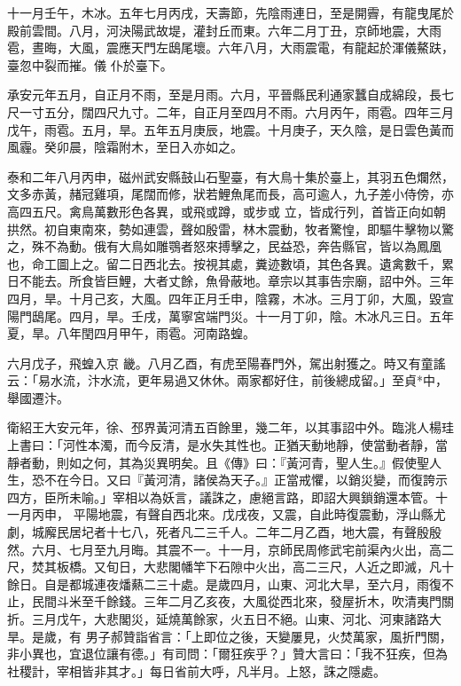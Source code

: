 \begin{pinyinscope}
 十一月壬午，木冰。五年七月丙戌，天壽節，先陰雨連日，至是開霽，有龍曳尾於殿前雲間。八月，河決陽武故堤，灌封丘而東。六年二月丁丑，京師地震，大雨雹，晝晦，大風，震應天門左鴟尾壞。六年八月，大雨震電，有龍起於渾儀鰲趺，臺忽中裂而摧。儀
 仆於臺下。



 承安元年五月，自正月不雨，至是月雨。六月，平晉縣民利通家蠶自成綿段，長七尺一寸五分，闊四尺九寸。二年，自正月至四月不雨。六月丙午，雨雹。四年三月戊午，雨雹。五月，旱。五年五月庚辰，地震。十月庚子，天久陰，是日雲色黃而風霾。癸卯晨，陰霜附木，至日入亦如之。



 泰和二年八月丙申，磁州武安縣鼓山石聖臺，有大鳥十集於臺上，其羽五色爛然，文多赤黃，赭冠雞項，尾闊而修，狀若鯉魚尾而長，高可逾人，九子差小侍傍，亦高四五尺。禽鳥萬數形色各異，或飛或蹲，或步或
 立，皆成行列，首皆正向如朝拱然。初自東南來，勢如連雲，聲如殷雷，林木震動，牧者驚惶，即驅牛擊物以驚之，殊不為動。俄有大鳥如雕鶚者怒來搏擊之，民益恐，奔告縣官，皆以為鳳凰也，命工圖上之。留二日西北去。按視其處，糞迹數頃，其色各異。遺禽數千，累日不能去。所食皆巨鯉，大者丈餘，魚骨蔽地。章宗以其事告宗廟，詔中外。三年四月，旱。十月己亥，大風。四年正月壬申，陰霧，木冰。三月丁卯，大風，毀宣陽門鴟尾。四月，旱。壬戌，萬寧宮端門災。十一月丁卯，陰。木冰凡三日。五年夏，旱。八年閏四月甲午，雨雹。河南路蝗。



 六月戊子，飛蝗入京
 畿。八月乙酉，有虎至陽春門外，駕出射獲之。時又有童謠云：「易水流，汴水流，更年易過又休休。兩家都好住，前後總成留。」至貞*中，舉國遷汴。



 衛紹王大安元年，徐、邳界黃河清五百餘里，幾二年，以其事詔中外。臨洮人楊珪上書曰：「河性本濁，而今反清，是水失其性也。正猶天動地靜，使當動者靜，當靜者動，則如之何，其為災異明矣。且《傳》曰：『黃河青，聖人生。』假使聖人生，恐不在今日。又曰『黃河清，諸侯為天子。』正當戒懼，以銷災變，而復誇示四方，臣所未喻。」宰相以為妖言，議誅之，慮絕言路，即詔大興鎖銷還本管。十一月丙申，
 平陽地震，有聲自西北來。戊戌夜，又震，自此時復震動，浮山縣尤劇，城廨民居圮者十七八，死者凡二三千人。二年二月乙酉，地大震，有聲殷殷然。六月、七月至九月晦。其震不一。十一月，京師民周修武宅前渠內火出，高二尺，焚其板橋。又旬日，大悲閣幡竿下石隙中火出，高二三尺，人近之即滅，凡十餘日。自是都城連夜燔爇二三十處。是歲四月，山東、河北大旱，至六月，雨復不止，民間斗米至千餘錢。三年二月乙亥夜，大風從西北來，發屋折木，吹清夷門關折。三月戊午，大悲閣災，延燒萬餘家，火五日不絕。山東、河北、河東諸路大旱。是歲，有
 男子郝贊詣省言：「上即位之後，天變屢見，火焚萬家，風折門關，非小異也，宜退位讓有德。」有司問：「爾狂疾乎？」贊大言曰：「我不狂疾，但為社稷計，宰相皆非其才。」每日省前大呼，凡半月。上怒，誅之隱處。




\end{pinyinscope}
